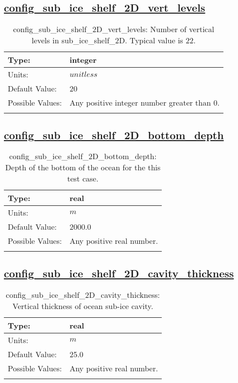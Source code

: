 \subsection[config\_sub\_ice\_shelf\_2D\_vert\_levels]{\hyperref[sec:nm_tab_sub_ice_shelf_2D]{config\_sub\_ice\_shelf\_2D\_vert\_levels}}
\label{subsec:nm_sec_config_sub_ice_shelf_2D_vert_levels}
\begin{center}
\begin{longtable}{| p{2.0in} || p{4.0in} |}
    \hline
    Type: & integer \\
    \hline
    Units: & $unitless$ \\
    \hline
    Default Value: & 20 \\
    \hline
    Possible Values: & Any positive integer number greater than 0. \\
    \hline
    \caption{config\_sub\_ice\_shelf\_2D\_vert\_levels: Number of vertical levels in sub\_ice\_shelf\_2D. Typical value is 22.}
\end{longtable}
\end{center}
\subsection[config\_sub\_ice\_shelf\_2D\_bottom\_depth]{\hyperref[sec:nm_tab_sub_ice_shelf_2D]{config\_sub\_ice\_shelf\_2D\_bottom\_depth}}
\label{subsec:nm_sec_config_sub_ice_shelf_2D_bottom_depth}
\begin{center}
\begin{longtable}{| p{2.0in} || p{4.0in} |}
    \hline
    Type: & real \\
    \hline
    Units: & $m$ \\
    \hline
    Default Value: & 2000.0 \\
    \hline
    Possible Values: & Any positive real number. \\
    \hline
    \caption{config\_sub\_ice\_shelf\_2D\_bottom\_depth: Depth of the bottom of the ocean for the this test case.}
\end{longtable}
\end{center}
\subsection[config\_sub\_ice\_shelf\_2D\_cavity\_thickness]{\hyperref[sec:nm_tab_sub_ice_shelf_2D]{config\_sub\_ice\_shelf\_2D\_cavity\_thickness}}
\label{subsec:nm_sec_config_sub_ice_shelf_2D_cavity_thickness}
\begin{center}
\begin{longtable}{| p{2.0in} || p{4.0in} |}
    \hline
    Type: & real \\
    \hline
    Units: & $m$ \\
    \hline
    Default Value: & 25.0 \\
    \hline
    Possible Values: & Any positive real number. \\
    \hline
    \caption{config\_sub\_ice\_shelf\_2D\_cavity\_thickness: Vertical thickness of ocean sub-ice cavity.}
\end{longtable}
\end{center}
